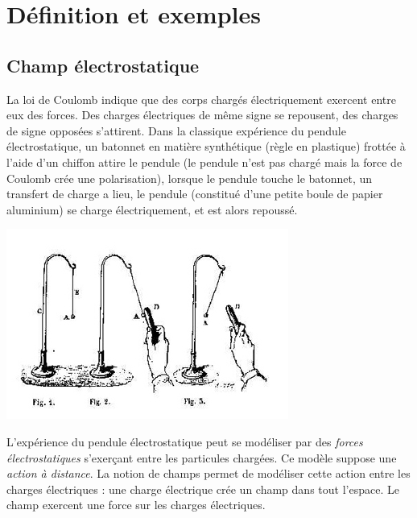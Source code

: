 
\section{Définition et exemples}
%


\subsection{Champ électrostatique}

La loi de Coulomb indique que des corps chargés électriquement exercent entre eux des forces. Des charges électriques de même signe se repousent, des charges de signe opposées s'attirent. Dans la classique expérience du pendule électrostatique, un batonnet en matière synthétique (règle en plastique) frottée à l'aide d'un chiffon attire le pendule (le pendule n'est pas chargé mais la force de Coulomb crée une polarisation), lorsque le pendule touche le batonnet, un transfert de charge a lieu, le pendule (constitué d'une petite boule de papier aluminium) se charge électriquement, et est alors repoussé.

\begin{center}
\includegraphics[scale=0.9]{./theorieDesChamps/MascartTraiteDElectriciteStatique1876}
\end{center}

L'expérience du pendule électrostatique peut se modéliser par des {\it forces électrostatiques} s'exerçant entre les particules chargées. Ce modèle suppose une {\it action à distance}. La notion de champs permet de modéliser cette action entre les charges électriques : une charge électrique crée un champ dans tout l'espace. Le champ exercent une force sur les charges électriques.


